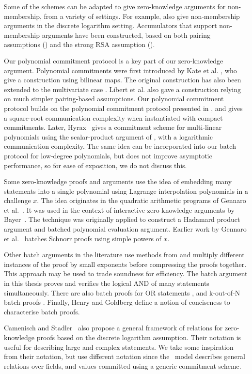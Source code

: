 Some of the schemes can be adapted to give zero-knowledge arguments for non-membership, from a variety of settings. For example, \cite{BayerG13,Peng2012} also give non-membership arguments in the discrete logarithm setting. Accumulators that support non-membership arguments have been constructed, based on both pairing assumptions (\cite{Damgard2008}) and the strong RSA assumption (\cite{Li2007}).

Our polynomial commitment protocol is a key part of our zero-knowledge argument. Polynomial commitments were first introduced by Kate et al. \cite{KateZG10}, who give a construction using bilinear maps. The original construction has also been extended to the multivariate case \cite{PapamanthouST13,ZhangGKPP17}. Libert et al. \cite{LibertRY16} also gave a construction relying on much simpler pairing-based assumptions. Our polynomial commitment protocol builds on the polynomial commitment protocol presented in \cite{BootleCCGP16}, and gives a square-root communication complexity when instantiated with compact commitments. Later, Hyrax~\cite{WahbyTSTW18} gives a commitment scheme for multi-linear polynomials using the scalar-product argument of \cite{BootleCCGP16,BunzBBPWM18}, with a logarithmic communication complexity. The same idea can be incorporated into our batch protocol for low-degree polynomials, but does not improve asymptotic performance, so for ease of exposition, we do not discuss this.

Some zero-knowledge proofs and arguments use the idea of embedding many statements into a single polynomial using Lagrange interpolation polynomials in a challenge $x$. The idea originates in the quadratic arithmetic programs of Gennaro et al.~\cite{Gennaro2013}. It was used in the context of interactive zero-knowledge arguments by Bayer~\cite{Bayer2014}. The technique was originally applied to construct a Hadamard product argument and batched polynomial evaluation argument. Earlier work by Gennaro et al.~\cite{Gennaro2004} batches Schnorr proofs using simple powers of $x$.

Other batch arguments in the literature use methods from \cite{Bellare1998} and multiply different instances of the proof by small exponents before compressing the proofs together. This approach may be used to trade soundness for efficiency. The batch argument in this thesis proves and verifies the logical AND of many statements simultaneously. There are also batch proofs for OR statements \cite{eng2009}, and k-out-of-N batch proofs \cite{Henry2013}. Finally, Henry and Goldberg \cite{Henry2013} define a notion of conciseness to characterise batch proofs.

Camenisch and Stadler~\cite{Camenisch1997} also propose a general framework of relations for zero-knowledge proofs based on the discrete logarithm assumption. Their notation is useful for describing large and complex statements. We take some inspiration from their notation, but use different notation since the \ILC\ model describes general relations over fields, and values committed using a generic commitment scheme.
